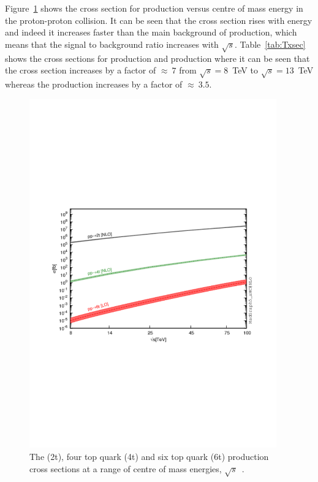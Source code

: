 Figure~\ref{fig:tttt100tev} shows the cross section for \tttt production versus centre of mass energy in the proton-proton collision. It can be seen that the cross section rises with energy and indeed it increases faster than the main background of \ttbar production, which means that the signal to background ratio increases with $\sqrt{s}$. Table~\ref{tab:Txsec} shows the cross sections for \tttt production and \ttbar production where it can be seen that the \tttt cross section increases by a factor of $\approx~7$ from $\sqrt{s} = 8$~TeV to $\sqrt{s} = 13$~TeV whereas the \ttbar production increases by a factor of $\approx~3.5$.

\begin{figure}[ht!]
\begin{center}
    \includegraphics[width=0.95\textwidth]{images/Analysis/100TeV.pdf}
    \caption{The \ttbar (2t), four top quark (4t) and six top quark (6t) production cross sections at a range of centre of mass energies, $\sqrt{s}$~\cite{Deandrea:2014raa}.}
    \label{fig:tttt100tev}
\end{center}
\end{figure}

